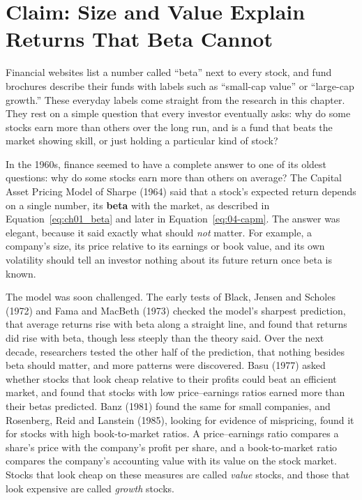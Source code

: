 \makeatletter
{}
\makeatother

\chapter{Claim: Size and Value Explain Returns That Beta Cannot}
\label{ch:03}
\providecommand{\term}[1]{\emph{#1}}

Financial websites list a number called ``beta'' next to every stock, and fund brochures describe their funds with labels such as ``small-cap value'' or ``large-cap growth.'' These everyday labels come straight from the research in this chapter. They rest on a simple question that every investor eventually asks: why do some stocks earn more than others over the long run, and is a fund that beats the market showing skill, or just holding a particular kind of stock?

In the 1960s, finance seemed to have a complete answer to one of its oldest questions: why do some stocks earn more than others on average? The Capital Asset Pricing Model of Sharpe (1964) said that a stock's expected return depends on a single number, its \textbf{beta} with the market, as described in Equation~\ref{eq:ch01_beta} and later in Equation~\ref{eq:04-capm}. The answer was elegant, because it said exactly what should \emph{not} matter. For example, a company's size, its price relative to its earnings or book value, and its own volatility should tell an investor nothing about its future return once beta is known.

The model was soon challenged. The early tests of Black, Jensen and Scholes (1972) and Fama and MacBeth (1973) checked the model's sharpest prediction, that average returns rise with beta along a straight line, and found that returns did rise with beta, though less steeply than the theory said. Over the next decade, researchers tested the other half of the prediction, that nothing besides beta should matter, and more patterns were discovered.
Basu (1977) asked whether stocks that look cheap relative to their profits could beat an efficient market, and found that stocks with low price--earnings ratios earned more than their betas predicted. Banz (1981) found the same for small companies, and Rosenberg, Reid and Lanstein (1985), looking for evidence of mispricing, found it for stocks with high book-to-market ratios. A price--earnings ratio compares a share's price with the company's profit per share, and a book-to-market ratio compares the company's accounting value with its value on the stock market. Stocks that look cheap on these measures are called \emph{value} stocks, and those that look expensive are called \emph{growth} stocks.


